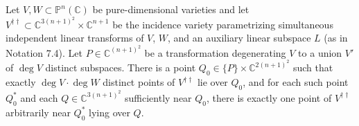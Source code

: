 Let $V, W \subset \mathbb{P}^n(\mathbb{C})$ be pure-dimensional varieties and let $V^{\dagger\dagger} \subset \mathbb{C}^{3(n+1)^2} \times \mathbb{C}^{n+1}$ be the incidence variety parametrizing simultaneous independent linear transforms of $V$, $W$, and an auxiliary linear subspace $L$ (as in Notation 7.4). Let $P \in \mathbb{C}^{(n+1)^2}$ be a transformation degenerating $V$ to a union $V'$ of $\deg V$ distinct subspaces. There is a point $Q_0 \in \{P\} \times \mathbb{C}^{2(n+1)^2}$ such that exactly $\deg V \cdot \deg W$ distinct points of $V^{\dagger\dagger}$ lie over $Q_0$, and for each such point $Q_0^*$ and each $Q \in \mathbb{C}^{3(n+1)^2}$ sufficiently near $Q_0$, there is exactly one point of $V^{\dagger\dagger}$ arbitrarily near $Q_0^*$ lying over $Q$.
